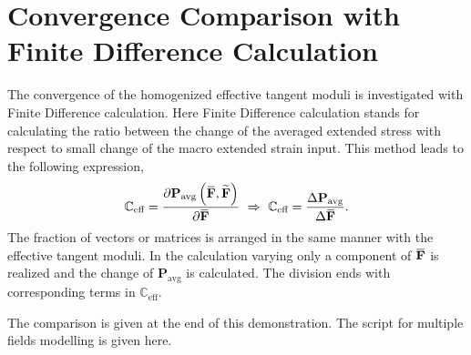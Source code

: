 \documentclass[10pt,a4paper]{scrreprt}
\newcommand{\overbar}[1]{\mkern 1.5mu\overline{\mkern-1.5mu#1\mkern-1.5mu}\mkern 1.5mu}
\begin{document}
\section{Convergence Comparison with Finite Difference Calculation}
The convergence of the homogenized effective tangent moduli is investigated with Finite Difference calculation. Here Finite Difference calculation stands for calculating the ratio between the change of the averaged extended stress with respect to small change of the macro extended strain input. This method leads to the following expression, 
\begin{equation}
\mathbb{C}_{\text{eff}} = \dfrac{\partial \mathbf{P}_{\text{avg}} \left( \overbar{\mathbf{F}}, \widetilde{\mathbf{F}} \right)}{\partial \overbar{\mathbf{F}}} \ \Rightarrow \ \mathbb{C}_{\text{eff}} = \dfrac{\Delta \mathbf{P}_{\text{avg}}}{\Delta \overbar{\mathbf{F}}}.
\end{equation}
The fraction of vectors or matrices is arranged in the same manner with the effective tangent moduli. In the calculation varying only a component of $\overbar{\mathbf{F}}$ is realized and the change of $\mathbf{P}_{\text{avg}}$ is calculated. The division ends with corresponding terms in $\mathbb{C}_{\text{eff}}$.

The comparison is given at the end of this demonstration. The script for multiple fields modelling is given here.
\end{document}
